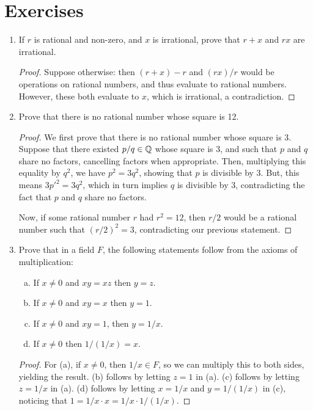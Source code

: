 \section{Exercises}
\begin{enumerate}
\item If $r$ is rational and non-zero, and $x$ is irrational, prove that $r + x$ and $rx$ are irrational.

\begin{proof}
Suppose otherwise: then $(r + x) - r$ and $(rx) / r$ would be operations on rational numbers, and thus evaluate to rational numbers. However, these both evaluate to $x$, which is irrational, a contradiction.
\end{proof}

\item Prove that there is no rational number whose square is 12.

\begin{proof}
We first prove that there is no rational number whose square is 3. Suppose that there existed $p / q \in \mathbb{Q}$ whose square is 3, and such that $p$ and $q$ share no factors, cancelling factors when appropriate. Then, multiplying this equality by $q^2$, we have $p^2 = 3q^2$, showing that $p$ is divisible by 3. But, this means $3p'^2 = 3q^2$, which in turn implies $q$ is divisible by 3, contradicting the fact that $p$ and $q$ share no factors.

Now, if some rational number $r$ had $r^2 = 12$, then $r/2$ would be a rational number such that $(r/2)^2 = 3$, contradicting our previous statement.
\end{proof}

\item Prove that in a field $F$, the following statements follow from the axioms of multiplication:
\begin{enumerate}[(a)]
\item If $x \ne 0$ and $xy = xz$ then $y = z$.
\item If $x \ne 0$ and $xy = x$ then $y = 1$.
\item If $x \ne 0$ and $xy = 1$, then $y = 1/x$.
\item If $x \ne 0$ then $1/(1/x) = x$.
\end{enumerate}
\begin{proof}
For (a), if $x \ne 0$, then $1/x \in F$, so we can multiply this to both sides, yielding the result. (b) follows by letting $z = 1$ in (a). (c) follows by letting $z = 1/x$ in (a). (d) follows by letting $x = 1/x$ and $y = 1/(1/x)$ in (c), noticing that $1 = 1/x \cdot x = 1/x \cdot 1/(1/x)$.
\end{proof}


\end{enumerate}
